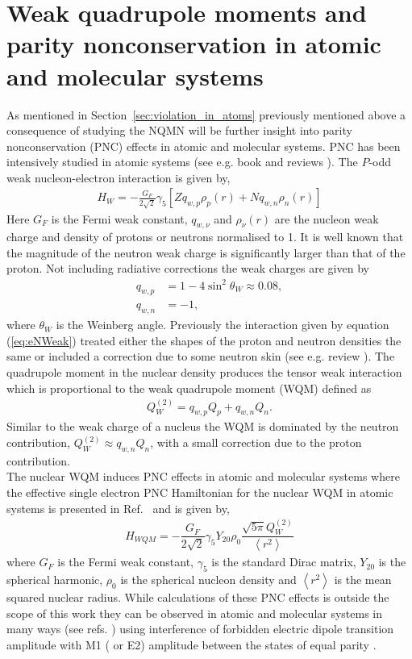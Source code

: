 \documentclass[10pt,a4paper, twoside, openright]{report}
\begin{document}
\section{Weak quadrupole moments and parity nonconservation in atomic and molecular systems\label{sec:PNC}} 
As mentioned in Section~\ref{sec:violation_in_atoms} previously mentioned above a consequence of studying the NQMN will be further insight into parity nonconservation (PNC) effects in atomic and molecular systems. PNC has been intensively studied in atomic systems (see e.g. book \cite{KhriplovichPNC} and reviews \cite{RobertsReview, GingesReview}).  The $P$-odd weak nucleon-electron interaction is given by,
\begin{align} \label{eq:eNWeak}
H_W = -\frac{G_F}{2\sqrt{2}}\gamma_{5}\left[Zq_{w, p}\rho_{p}(r) + Nq_{w, n}\rho_{n}(r)\right]
\end{align}
Here $G_F$ is the Fermi weak constant, $q_{w,\nu}$ and $\rho_{\nu}(r)$ are the nucleon weak charge  and density of protons or neutrons  normalised to 1. It is well known that the magnitude of the neutron weak charge is significantly larger than that of the proton. Not including radiative corrections the weak charges  are given by 
\begin{align*}
q_{w,p} &= 1 - 4\sin^2\theta_W \approx 0.08 ,\\
q_{w,n} &= -1,
\end{align*}
where $\theta_W$ is the Weinberg angle.  Previously the interaction given by equation (\ref{eq:eNWeak}) treated either the shapes of the proton and neutron densities  the same  or included a correction due to some neutron skin (see e.g. review \cite{RobertsReview}).  The quadrupole moment in the nuclear density produces the tensor weak interaction which is proportional to the weak quadrupole moment (WQM) defined as  \cite{FDC17}
\begin{align*}
Q_{W}^{(2)} = q_{w,p}Q_{p} + q_{w,n}Q_n.
\end{align*}
Similar to the weak charge of a nucleus the WQM is dominated by the neutron contribution,  $Q_{W}^{(2)} \approx q_{w,n}Q_n$,  with a small correction due to the proton contribution. \\

The nuclear WQM induces PNC effects in atomic and molecular systems where the effective single electron  PNC Hamiltonian for the nuclear WQM in atomic systems is presented in Ref.~\cite{FDC17} and is given by,
\begin{align*}
H_{WQM}=-\dfrac{G_F}{2\sqrt{2}}\gamma_5Y_{20}\rho_{0}\dfrac{\sqrt{5\pi}Q_{W}^{(2)}}{\left<r^2\right>}
\end{align*}
where $G_F$ is the Fermi weak constant, $\gamma_5$ is the standard Dirac matrix, $Y_{20}$ is the spherical harmonic, $\rho_0$ is the spherical nucleon density and $\left<r^2\right>$ is the mean squared nuclear radius. While calculations of these PNC effects is outside the scope of this work they can be observed in atomic and molecular systems in many ways (see refs. \cite{FDC17, RobertsReview, KhriplovichPNC, GingesReview}) using interference of forbidden electric dipole transition amplitude with M1 ( or E2) amplitude between the states of equal parity \cite{FDC17}.
\end{document}
